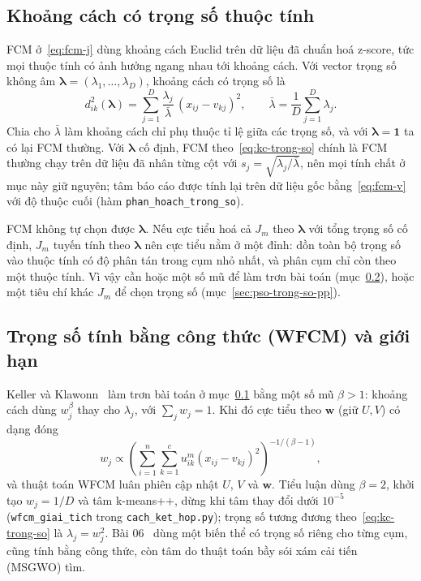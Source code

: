 \subsection{Khoảng cách có trọng số thuộc tính}
\label{sec:kc-trong-so}

FCM ở~\eqref{eq:fcm-j} dùng khoảng cách Euclid trên dữ liệu đã chuẩn hoá z-score, tức mọi thuộc tính có ảnh hưởng ngang
nhau tới khoảng cách. Với vector trọng số không âm $\symbf{\lambda} = (\lambda_1, \dots, \lambda_D)$, khoảng cách có trọng
số là
\begin{equation}
  d_{ik}^{2}(\symbf{\lambda}) = \sum_{j=1}^{D} \frac{\lambda_j}{\bar{\lambda}} \, (x_{ij} - v_{kj})^{2},
  \qquad \bar{\lambda} = \frac{1}{D} \sum_{j=1}^{D} \lambda_j .
  \label{eq:kc-trong-so}
\end{equation}
Chia cho $\bar{\lambda}$ làm khoảng cách chỉ phụ thuộc tỉ lệ giữa các trọng số, và với $\symbf{\lambda} = \mathbf{1}$ ta có
lại FCM thường. Với $\symbf{\lambda}$ cố định, FCM theo~\eqref{eq:kc-trong-so} chính là FCM thường chạy trên dữ liệu đã nhân
từng cột với $s_j = \sqrt{\lambda_j / \bar{\lambda}}$, nên mọi tính chất ở mục này giữ nguyên; tâm báo cáo được tính lại
trên dữ liệu gốc bằng~\eqref{eq:fcm-v} với độ thuộc cuối (hàm \texttt{phan\_hoach\_trong\_so}).

FCM không tự chọn được $\symbf{\lambda}$. Nếu cực tiểu hoá cả $J_m$ theo $\symbf{\lambda}$ với tổng trọng số cố định,
$J_m$ tuyến tính theo $\symbf{\lambda}$ nên cực tiểu nằm ở một đỉnh: dồn toàn bộ trọng số vào thuộc tính có độ phân tán
trong cụm nhỏ nhất, và phân cụm chỉ còn theo một thuộc tính. Vì vậy cần hoặc một số mũ để làm trơn bài toán
(mục~\ref{sec:wfcm}), hoặc một tiêu chí khác $J_m$ để chọn trọng số (mục~\ref{sec:pso-trong-so-pp}).

\subsection{Trọng số tính bằng công thức (WFCM) và giới hạn}
\label{sec:wfcm}

Keller và Klawonn~\cite{keller2000weighting} làm trơn bài toán ở mục~\ref{sec:kc-trong-so} bằng một số mũ $\beta > 1$: khoảng
cách dùng $w_j^{\beta}$ thay cho $\lambda_j$, với $\sum_j w_j = 1$. Khi đó cực tiểu theo $\mathbf{w}$ (giữ $U, V$) có dạng
đóng
\begin{equation}
  w_j \propto \left( \sum_{i=1}^{n} \sum_{k=1}^{c} u_{ik}^{m} (x_{ij} - v_{kj})^{2} \right)^{-1/(\beta - 1)},
  \label{eq:wfcm-w}
\end{equation}
và thuật toán WFCM luân phiên cập nhật $U$, $V$ và $\mathbf{w}$. Tiểu luận dùng $\beta = 2$, khởi tạo $w_j = 1/D$ và tâm
k-means++, dừng khi tâm thay đổi dưới $10^{-5}$ (\texttt{wfcm\_giai\_tich} trong \texttt{cach\_ket\_hop.py}); trọng số
tương đương theo~\eqref{eq:kc-trong-so} là $\lambda_j = w_j^{2}$. Bài 06~\cite{liu2021msgwo} dùng một biến thể có trọng số
riêng cho từng cụm, cũng tính bằng công thức, còn tâm do thuật toán bầy sói xám cải tiến (MSGWO) tìm.

